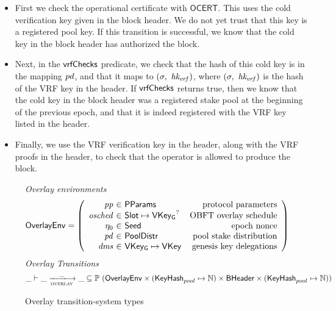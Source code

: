 \begin{itemize}
  \item First we check the operational certificate with $\mathsf{OCERT}$.
  This uses the cold verification key given in the block header.
  We do not yet trust that this key is a registered pool key.
  If this transition is successful, we know that the cold key in the block header has authorized
  the block.
\item  Next, in the $\mathsf{vrfChecks}$ predicate, we check that the hash of this cold key is in the
  mapping $\mathit{pd}$, and that it maps to $(\sigma,~\mathit{hk_{vrf}})$, where
  $(\sigma,~\mathit{hk_{vrf}})$ is the hash of the VRF key in the header.
  If $\mathsf{vrfChecks}$ returns true, then we know that the cold key in the block header was a
  registered stake pool at the beginning of the previous epoch, and that it is indeed registered
  with the VRF key listed in the header.
\item Finally, we use the VRF verification key in the header, along with the VRF proofs in the
  header, to check that the operator is allowed to produce the block.
\end{itemize}

\begin{figure}
  \emph{Overlay environments}
  \begin{equation*}
    \OverlayEnv =
    \left(
      \begin{array}{r@{~\in~}lr}
        \var{pp} & \PParams & \text{protocol parameters} \\
        \var{osched} & \Slot\mapsto\VKeyGen^? & \text{OBFT overlay schedule} \\
        \eta_0 & \Seed & \text{epoch nonce} \\
        \var{pd} & \PoolDistr & \text{pool stake distribution} \\
        \var{dms} & \VKeyGen\mapsto\VKey & \text{genesis key delegations} \\
      \end{array}
    \right)
  \end{equation*}
  \emph{Overlay Transitions}
  \begin{equation*}
    \_ \vdash \var{\_} \trans{overlay}{\_} \var{\_} \subseteq
    \powerset (\OverlayEnv \times (\KeyHash_{pool} \mapsto \N) \times \BHeader \times
    (\KeyHash_{pool} \mapsto \N))
  \end{equation*}
  \caption{Overlay transition-system types}
  \label{fig:ts-types:overlay}
\end{figure}

